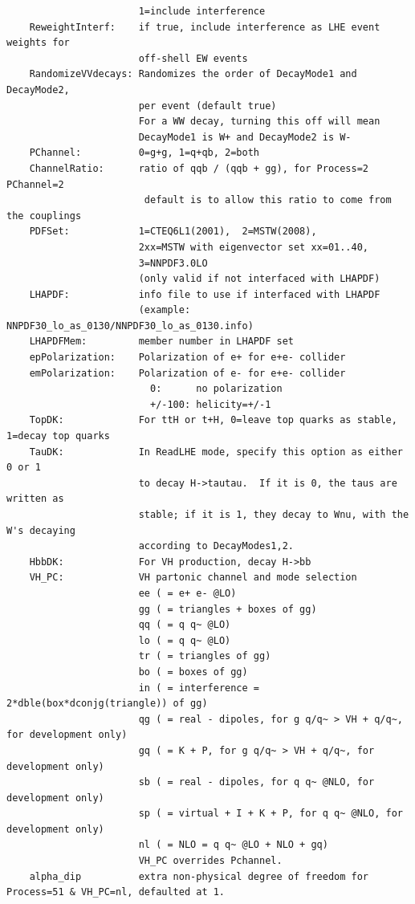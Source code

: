 \documentclass[aps,superscriptaddress,nofootinbib]{revtex4}
\begin{document}
\begin{verbatim}
                       1=include interference
    ReweightInterf:    if true, include interference as LHE event weights for
                       off-shell EW events
    RandomizeVVdecays: Randomizes the order of DecayMode1 and DecayMode2,
                       per event (default true)
                       For a WW decay, turning this off will mean
                       DecayMode1 is W+ and DecayMode2 is W-
    PChannel:          0=g+g, 1=q+qb, 2=both
    ChannelRatio:      ratio of qqb / (qqb + gg), for Process=2 PChannel=2
                        default is to allow this ratio to come from the couplings
    PDFSet:            1=CTEQ6L1(2001),  2=MSTW(2008),
                       2xx=MSTW with eigenvector set xx=01..40,
                       3=NNPDF3.0LO
                       (only valid if not interfaced with LHAPDF)
    LHAPDF:            info file to use if interfaced with LHAPDF
                       (example: NNPDF30_lo_as_0130/NNPDF30_lo_as_0130.info)
    LHAPDFMem:         member number in LHAPDF set
    epPolarization:    Polarization of e+ for e+e- collider
    emPolarization:    Polarization of e- for e+e- collider
                         0:      no polarization
                         +/-100: helicity=+/-1
    TopDK:             For ttH or t+H, 0=leave top quarks as stable, 1=decay top quarks
    TauDK:             In ReadLHE mode, specify this option as either 0 or 1
                       to decay H->tautau.  If it is 0, the taus are written as
                       stable; if it is 1, they decay to Wnu, with the W's decaying
                       according to DecayModes1,2.
    HbbDK:             For VH production, decay H->bb
    VH_PC:             VH partonic channel and mode selection
                       ee ( = e+ e- @LO)
                       gg ( = triangles + boxes of gg)
                       qq ( = q q~ @LO)
                       lo ( = q q~ @LO)
                       tr ( = triangles of gg)
                       bo ( = boxes of gg)
                       in ( = interference = 2*dble(box*dconjg(triangle)) of gg)
                       qg ( = real - dipoles, for g q/q~ > VH + q/q~, for development only)
                       gq ( = K + P, for g q/q~ > VH + q/q~, for development only)
                       sb ( = real - dipoles, for q q~ @NLO, for development only)
                       sp ( = virtual + I + K + P, for q q~ @NLO, for development only)
                       nl ( = NLO = q q~ @LO + NLO + gq)
                       VH_PC overrides Pchannel.
    alpha_dip          extra non-physical degree of freedom for Process=51 & VH_PC=nl, defaulted at 1.

\end{verbatim}
\end{document}
